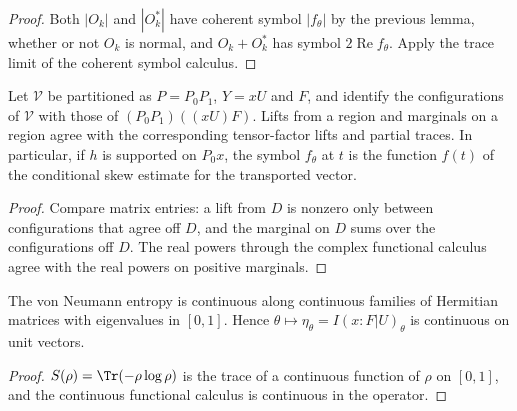 \begin{proof}\leanok
    Both $|O_k|$ and $|O_k^\ast|$ have coherent symbol $|f_\theta|$ by the previous lemma,
    whether or not $O_k$ is normal, and $O_k+O_k^\ast$ has symbol $2\operatorname{Re}f_\theta$.
    Apply the trace limit of the coherent symbol calculus.
\end{proof}

\begin{lemma}
    \label{lem:region_split}
    \leanok
    Let $\mathcal V$ be partitioned as $P=P_0P_1$, $Y=xU$ and $F$, and identify the
    configurations of $\mathcal V$ with those of $(P_0P_1)((xU)F)$. Lifts from a region and
    marginals on a region agree with the corresponding tensor-factor lifts and partial
    traces. In particular, if $h$ is supported on $P_0x$, the symbol $f_\theta$ at $t$ is
    the function $f(t)$ of the conditional skew estimate for the transported vector.
\end{lemma}

\begin{proof}\leanok
    Compare matrix entries: a lift from $D$ is nonzero only between configurations that
    agree off $D$, and the marginal on $D$ sums over the configurations off $D$. The real
    powers through the complex functional calculus agree with the real powers on positive
    marginals.
\end{proof}

\begin{lemma}
    \label{lem:entropy_continuity}
    \leanok
    The von Neumann entropy is continuous along continuous families of Hermitian matrices
    with eigenvalues in $[0,1]$. Hence $\theta\mapsto\eta_\theta=I(x:F|U)_\theta$ is continuous
    on unit vectors.
\end{lemma}

\begin{proof}\leanok
    $S(\rho)=\Tr(-\rho\log\rho)$ is the trace of a continuous function of $\rho$ on $[0,1]$,
    and the continuous functional calculus is continuous in the operator.
\end{proof}

